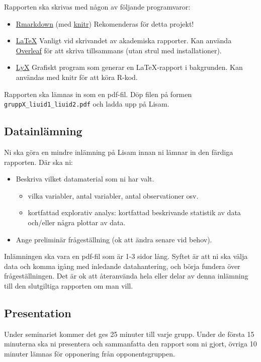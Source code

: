 \documentclass[a4paper]{article}
\begin{document}
Rapporten ska skrivas med någon av följande programvaror:
\begin{itemize}
    \item \href{https://rmarkdown.rstudio.com/}{Rmarkdown} (med \href{https://yihui.org/knitr/}{knitr}) Rekomenderas för detta projekt!
    \item \href{https://en.wikipedia.org/wiki/LaTeX}{LaTeX} Vanligt vid skrivandet av akademiska rapporter. Kan använda \href{https://www.overleaf.com}{Overleaf} för att skriva tillsammans (utan strul med installationer).
    \item \href{https://www.lyx.org/}{LyX} Grafiskt program som generar en LaTeX-rapport i bakgrunden. Kan användas med knitr för att köra R-kod.
\end{itemize}
Rapporten ska lämnas in som en pdf-fil.  Döp filen på formen \texttt{gruppX\_liuid1\_liuid2.pdf} och ladda upp på Lisam.

\subsection*{Datainlämning}
Ni ska göra en mindre inlämning på Lisam innan ni lämnar in den färdiga rapporten. Där ska ni:
\begin{itemize}
    \item Beskriva vilket datamaterial som ni har valt.
    \begin{itemize}
        \item vilka variabler, antal variabler, antal observationer osv.
        \item kortfattad explorativ analys: kortfattad beskrivande statistik av data och/eller några plottar av data.
    \end{itemize}
    \item Ange preliminär frågeställning (ok att ändra senare vid behov).
\end{itemize}
Inlämningen ska vara en pdf-fil som är 1-3 sidor lång. Syftet är att ni ska välja data och komma igång med inledande datahantering, och börja fundera över frågeställningen. Det är ok att återanvända hela eller delar av denna inlämning till den slutgiltiga rapporten om man vill.

\subsection*{Presentation}
Under seminariet kommer det ges 25 minuter till varje grupp. Under de första 15 minuterna ska ni presentera och sammanfatta den rapport som ni gjort, övriga 10 minuter lämnas för opponering från opponentsgruppen.
\end{document}
